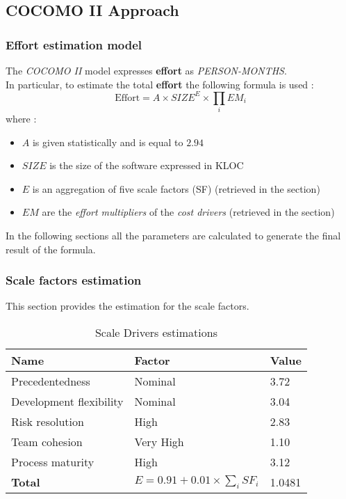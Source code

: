 \subsection{COCOMO II Approach} %
\label{sec:cocomo_approach}

\subsubsection{Effort estimation model}
The \emph{COCOMO II} model expresses \textbf{effort} as \emph{PERSON-MONTHS}.\\
In particular, to estimate the total \textbf{effort} the following formula is used :
\begin{equation}
    \textrm{Effort} = A \times SIZE^E \times \prod_i EM_i
    \label{eq:effort}
\end{equation}
where :
\begin{itemize}
	\item $A$ is given statistically and is equal to $2.94$
	\item $SIZE$ is the size of the software expressed in KLOC
	\item $E$ is an aggregation of five scale factors (SF) (retrieved in the \emph{} section)
	\item $EM$ are the \emph{effort multipliers} of the \emph{cost drivers} (retrieved in the \emph{} section)
\end{itemize}
In the following sections all the parameters are calculated to generate the final result of the formula.

\subsubsection{Scale factors estimation}
\label{sub:scale_factors}
This section provides the estimation for the scale factors.
\begin{table}[!htbp]
    \centering
    \begin{tabular}{| l | l | l |}
        \hline
        \textbf{Name}             & \textbf{Factor}   & \textbf{Value}    \\
        \hline
        Precedentedness           & Nominal           & 3.72                 \\
        \hline
        Development flexibility   & Nominal           & 3.04                 \\
        \hline
        Risk resolution           & High              & 2.83                 \\
        \hline
        Team cohesion             & Very High         & 1.10                 \\
        \hline
        Process maturity          & High              & 3.12                 \\
        \hline
        \textbf{Total}  & \multicolumn{1}{|c|}{$E=0.91 + 0.01 \times \sum_{i}SF_i$}    & 1.0481       \\
        \hline
    \end{tabular}
    \caption{Scale Drivers estimations}
    \label{tab:scale-drivers}
\end{table}


